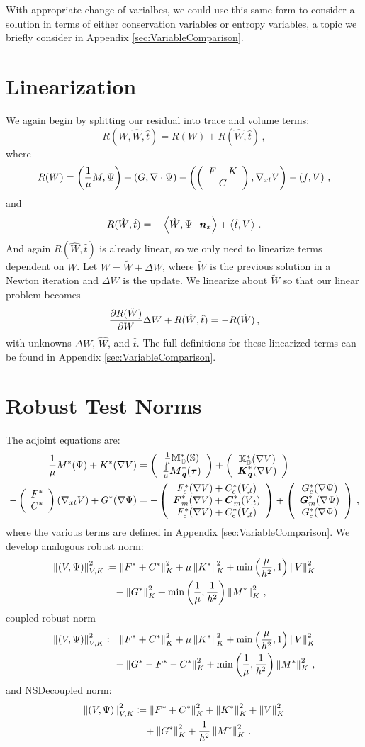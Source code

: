 \documentclass[Dissertation.tex]{subfiles}
\begin{document}
With appropriate change of varialbes, we could use this same form to consider a solution in terms
of either conservation variables or entropy variables, 
a topic we briefly consider in Appendix \ref{sec:VariableComparison}.


\section{Linearization}
We again begin by splitting our residual into trace and volume terms:
\[
R(W,\hat W,\hat t) = R(W) + R(\hat W,\hat t)\,,
\]
where
\[
R(W)=
\left( \frac{1}{\mu}M,\Psi \right)+\left( G,\nabla\cdot\Psi \right)
-\left( \left( \begin{array}{c} F-K\\ C\\ \end{array} \right),\nabla_{xt} V \right)-\left( f,V \right)\,,
\]
and
\[
R(\hat W,\hat t)=
-\left\langle \hat W,\Psi\cdot\boldsymbol n_x \right\rangle
+\left\langle \hat t,V \right\rangle\,.
\]
And again $R(\hat W,\hat t)$ is already linear, so we only need to linearize terms dependent on $W$.
Let $W=\tilde W+\Delta W$, where $\tilde W$ is the previous solution in a Newton iteration and 
$\Delta W$ is the update. We linearize about $\tilde W$ so that our linear problem becomes
\[
\frac{\partial R(\tilde W)}{\partial W}\Delta W+R(\hat W,\hat t)=-R(\tilde W)\,,
\]
with unknowns $\Delta W$, $\hat W$, and $\hat t$.
The full definitions for these linearized terms can be found in Appendix \ref{sec:VariableComparison}.

\section{Robust Test Norms}
The adjoint equations are:
\begin{align*}
\frac{1}{\mu}M^*(\Psi)+K^*(\nabla V)&=\left( \begin{array}{c} \frac{1}{\mu}\mathbb{M}_{\mathbb{D}}^*(\mathbb{S})\\ \frac{1}{\mu}\boldsymbol M_{\boldsymbol q}^*(\boldsymbol\tau)\\ \end{array} \right)
+\left( \begin{array}{c} \mathbb{K}_{\mathbb{D}}^*(\nabla V)\\ \boldsymbol K_{\boldsymbol q}^*(\nabla V)\\ \end{array} \right)\\
-\left( \begin{array}{c} F^*\\ C^*\\ \end{array} \right)(\nabla_{xt} V)+G^*(\nabla\Psi)&=-\left( \begin{array}{c} F_c^*(\nabla V)+C_c^*(V_{,t})\\ \boldsymbol F_m^*(\nabla V)+\boldsymbol C_m^*(V_{,t})\\ F_e^*(\nabla V)+C_e^*(V_{,t})\\ \end{array} \right)
+\left( \begin{array}{c} G_c^*(\nabla\Psi)\\ \boldsymbol G_m^*(\nabla\Psi)\\ G_e^*(\nabla\Psi)\\ \end{array} \right)\,,
\end{align*}
where the various terms are defined in Appendix \ref{sec:VariableComparison}.
We develop analogous robust norm:
\begin{align*}
\left\| \left( V,\Psi \right) \right\|_{V,K}^2 &\coloneqq
\left\| F^*+C^* \right\|_K^2
+ \mu\left\| K^* \right\|_K^2
+ \min\left( \frac{\mu}{h^2},1 \right)\left\| V \right\|^2_K
\\\nonumber&\quad
+ \left\| G^* \right\|_K^2
+ \min\left( \frac{1}{\mu},\frac{1}{h^2} \right)\left\| M^* \right\|_K^2\,,
\end{align*}
coupled robust norm
\begin{align*}
\left\| \left( V,\Psi \right) \right\|_{V,K}^2 &\coloneqq
\left\| F^*+C^* \right\|_K^2
+ \mu\left\| K^* \right\|_K^2
+ \min\left( \frac{\mu}{h^2},1 \right)\left\| V \right\|^2_K
\\\nonumber&\quad
+ \left\| G^*-F^*-C^* \right\|_K^2
+ \min\left( \frac{1}{\mu},\frac{1}{h^2} \right)\left\| M^* \right\|_K^2\,,
\end{align*}
and NSDecoupled norm:
\begin{align*}
\left\| \left( V,\Psi \right) \right\|_{V,K}^2 &\coloneqq
\left\| F^*+C^* \right\|_K^2
+ \left\| K^* \right\|_K^2
+ \left\| V \right\|^2_K
\\\nonumber&\quad
+ \left\| G^* \right\|_K^2
+ \frac{1}{h^2}\left\| M^* \right\|_K^2\,.
\end{align*}
\end{document}
